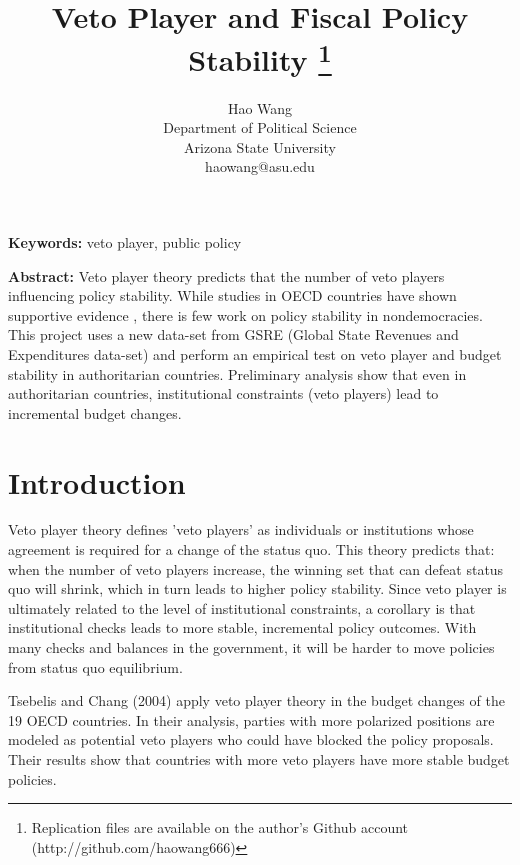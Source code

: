 \documentclass[12pt]{article}\usepackage[]{graphicx}\usepackage[]{color}
\begin{document}
\title{\textbf{Veto Player and Fiscal Policy Stability \footnote{Replication files are available on the author's Github account (http://github.com/haowang666)}}}
\bigskip
\onehalfspacing\author{
	Hao Wang \\ Department of Political Science\\Arizona State University\\haowang@asu.edu
	}
\maketitle \thispagestyle{empty}




\noindent \textbf{Keywords:} {veto player, public policy}

\bigskip

\noindent \textbf{Abstract:} {Veto player theory \cite{Tsebelis2002} predicts that the number of veto players influencing policy stability. While studies in OECD countries have shown supportive evidence \cite{TsebelisChang2004}, there is few work on policy stability in nondemocracies. This project uses a new data-set from GSRE (Global State Revenues and Expenditures data-set) and perform an empirical test on veto player and budget stability in authoritarian countries. Preliminary analysis show that even in authoritarian countries, institutional constraints (veto players) lead to incremental budget changes.}
\newpage

\doublespacing


\section{Introduction}
Veto player theory \cite{Tsebelis2002} defines 'veto players' as individuals or institutions whose agreement is required for a change of the status quo. This theory predicts that: when the number of veto players increase, the winning set that can defeat status quo will shrink, which in turn leads to higher policy stability. Since veto player is ultimately related to the level of institutional constraints, a corollary is that institutional checks leads to more stable, incremental policy outcomes. With many checks and balances in the government, it will be harder to move policies from status quo equilibrium. 

Tsebelis and Chang (2004) apply veto player theory in the budget changes of the 19 OECD countries. In their analysis, parties with more polarized positions are modeled as potential veto players who could have blocked the policy proposals. Their results show that countries with more veto players have more stable budget policies. 
\end{document}
